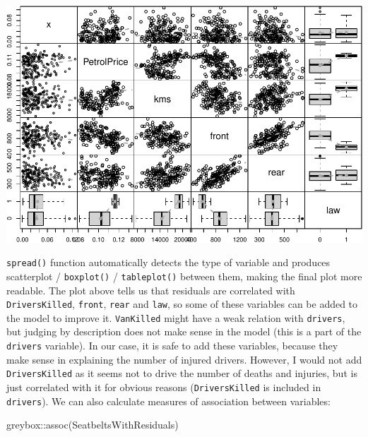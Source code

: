 \documentclass[
]{book}
\newenvironment{Shaded}{\begin{snugshade}}{\end{snugshade}}
\newcommand{\FunctionTok}[1]{\textcolor[rgb]{0.00,0.00,0.00}{#1}}
\newcommand{\NormalTok}[1]{#1}
\newcommand{\SpecialCharTok}[1]{\textcolor[rgb]{0.00,0.00,0.00}{#1}}
\theoremstyle{definition}
\theoremstyle{definition}
\theoremstyle{definition}
\theoremstyle{definition}
\theoremstyle{remark}
\begin{document}
\includegraphics{adam_files/figure-latex/unnamed-chunk-129-1.pdf}

\texttt{spread()} function automatically detects the type of variable and produces scatterplot / \texttt{boxplot()} / \texttt{tableplot()} between them, making the final plot more readable. The plot above tells us that residuals are correlated with \texttt{DriversKilled}, \texttt{front}, \texttt{rear} and \texttt{law}, so some of these variables can be added to the model to improve it. \texttt{VanKilled} might have a weak relation with \texttt{drivers}, but judging by description does not make sense in the model (this is a part of the \texttt{drivers} variable). In our case, it is safe to add these variables, because they make sense in explaining the number of injured drivers. However, I would not add \texttt{DriversKilled} as it seems not to drive the number of deaths and injuries, but is just correlated with it for obvious reasons (\texttt{DriversKilled} is included in \texttt{drivers}). We can also calculate measures of association between variables:

\begin{Shaded}
\begin{Highlighting}[]
\NormalTok{greybox}\SpecialCharTok{::}\FunctionTok{assoc}\NormalTok{(SeatbeltsWithResiduals)}
\end{Highlighting}
\end{Shaded}
\end{document}
